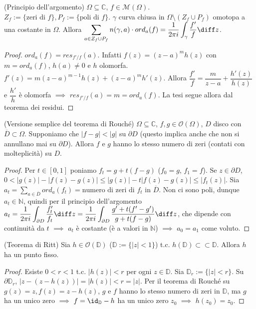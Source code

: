 \begin{thm}
  (Principio dell'argomento) $\Omega \subseteq \mathbb{C}$, $f \in \mathcal{M}(\Omega)$. $Z_f:=\{\text{zeri di } f\}, P_f:=\{\text{poli di } f\}$. $\gamma$ curva chiusa in $\Omega \setminus (Z_f \cup P_f)$ omotopa a una costante in $\Omega$.
  Allora $\displaystyle \sum_{a \in Z_f \cup P_f} n(\gamma, a) \cdot ord_a(f)=\frac{1}{2\pi i}\int_{\gamma} \frac{f'}{f} \diff z$.
\end{thm}

\begin{proof}
  $ord_a(f)=res_{f'/f}(a)$. Infatti $f(z)=(z-a)^mh(z)$ con $m=ord_a(f)$, $h(a) \not=0$ e $h$ olomorfa. $f'(z)=m(z-a)^{m-1}h(z)+(z-a)^mh'(z)$. Allora $\dfrac{f'}{f}=\dfrac{m}{z-a}+\dfrac{h'(z)}{h(z)}$ e $\dfrac{h'}{h}$ è olomorfa $\implies$ $res_{f'/f}(a)=m=ord_a(f)$. La tesi segue allora dal teorema dei residui.
\end{proof}

\begin{prop}
  (Versione semplice del teorema di Rouché) $\Omega \subseteq \mathbb{C}$, $f, g \in \mathcal{O}(\Omega)$, $D$ disco con $\overline{D} \subset \Omega$. Supponiamo che $|f-g|<|g|$ su $\partial D$ (questo implica anche che non si annullano mai su $\partial D$). Allora $f$ e $g$ hanno lo stesso numero di zeri (contati con molteplicità) su $D$.
\end{prop}

\begin{proof}
  Per $t \in [0, 1]$ poniamo $f_t=g+t(f-g)$ ($f_0=g$, $f_1=f$). Se $z \in \partial D$, $0<|g(z)|-|f(z)-g(z)| \le |g(z)|-t|f(z)-g(z)| \le |f_t(z)|$. Sia $\displaystyle a_t=\sum_{a \in \overline{D}} ord_a(f_t)=\text{numero di zeri di } f_t \text{ in } \overline{D}$.
  Non ci sono poli, dunque $a_t \in \mathbb{N}$, quindi per il principio dell'argomento $\displaystyle a_t=\frac{1}{2\pi i} \int_{\partial D} \frac{f_t'}{f_t} \diff z=\frac{1}{2\pi i} \int_{\partial D} \frac{g'+t(f'-g')}{g+t(f-g)} \diff z$,
  che dipende con continuità da $t$ $\implies$ $a_t$ è costante (è a valori in $\mathbb{N}$) $\implies$ $a_0=a_1$ come voluto.
\end{proof}

\begin{cor}
  (Teorema di Ritt) Sia $h \in \mathcal{O}(\mathbb{D})$ ($\mathbb{D}:=\{|z|<1\}$) t.c. $h(\mathbb{D}) \subset \subset \mathbb{D}$. Allora $h$ ha un punto fisso.
\end{cor}

\begin{proof}
  Esiste $0<r<1$ t.c. $|h(z)|<r$ per ogni $z \in \mathbb{D}$. Sia $\mathbb{D}_r:=\{|z|<r\}$. Su $\partial \mathbb{D}_r$, $|z-(z-h(z))|=|h(z)|<r=|z|$.
  Per il teorema di Rouché su $g(z)=z, f(z)=z-h(z)$, $g$ e $f$ hanno lo stesso numero di zeri in $\mathbb{D}$, ma $g$ ha un unico zero $\implies$ $f=\id_{\mathbb{D}}-h$ ha un unico zero $z_0$ $\implies$ $h(z_0)=z_0$.
\end{proof}
